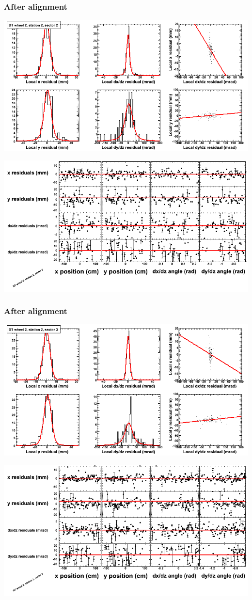 \documentclass[compress]{beamer}
\begin{document}
\begin{frame}
\frametitle{After alignment}
\includegraphics[width=0.7\linewidth]{NOV4_fitfunctions/MBwhEst2sec02_bellcurves.png}

\includegraphics[width=0.7\linewidth]{NOV4_fitfunctions/MBwhEst2sec02_polynomials.png}
\end{frame}

\begin{frame}
\frametitle{After alignment}
\includegraphics[width=0.7\linewidth]{NOV4_fitfunctions/MBwhEst2sec03_bellcurves.png}

\includegraphics[width=0.7\linewidth]{NOV4_fitfunctions/MBwhEst2sec03_polynomials.png}
\end{frame}
\end{document}
